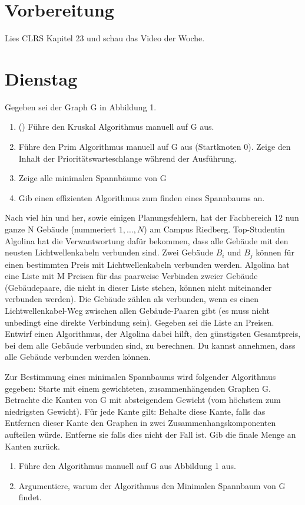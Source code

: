 \documentclass{uebung_cs}
\begin{document}
\section*{Vorbereitung}
Lies CLRS Kapitel 23 und schau das Video der Woche.

\section*{Dienstag}
\begin{aufgabe}\label{tue-first}
	Gegeben sei der Graph G in Abbildung 1.
	\begin{enumerate}
		\item (\warmup) Führe den Kruskal Algorithmus manuell auf G aus.
		\item Führe den Prim Algorithmus manuell auf G aus (Startknoten 0). Zeige den Inhalt der Prioritätswarteschlange während der Ausführung.
		\item Zeige alle minimalen Spannbäume von G
		\item Gib einen effizienten Algorithmus zum finden eines Spannbaums an.
	\end{enumerate}
\end{aufgabe}

\begin{aufgabe}
	Nach viel hin und her, sowie einigen Planungsfehlern, hat der Fachbereich 12 nun ganze N Gebäude (nummeriert $1,\ldots , N$) am Campus Riedberg.
	Top-Studentin Algolina hat die Verwantwortung dafür bekommen, dass alle Gebäude mit den neusten Lichtwellenkabeln verbunden sind.
	Zwei Gebäude $B_i$ und $B_j$ können für einen bestimmten Preis mit Lichtwellenkabeln verbunden werden.
	Algolina hat eine Liste mit M Preisen für das paarweise Verbinden zweier Gebäude (Gebäudepaare, die nicht in dieser Liste stehen, können nicht miteinander verbunden werden).
	Die Gebäude zählen als verbunden, wenn es einen Lichtwellenkabel-Weg zwischen allen Gebäude-Paaren gibt (es muss nicht unbedingt eine direkte Verbindung sein).
	Gegeben sei die Liste an Preisen.
	Entwirf einen Algorithmus, der Algolina dabei hilft, den günstigsten Gesamtpreis, bei dem alle Gebäude verbunden sind, zu berechnen.
	Du kannst annehmen, dass alle Gebäude verbunden werden können. 
\end{aufgabe}

\begin{aufgabe}
	Zur Bestimmung eines minimalen Spannbaums wird folgender Algorithmus gegeben: Starte mit einem gewichteten, zusammenhängenden Graphen G. Betrachte die Kanten von G mit absteigendem Gewicht (vom höchstem zum niedrigsten Gewicht).
	Für jede Kante gilt: Behalte diese Kante, falls das Entfernen dieser Kante den Graphen in zwei Zusammenhangskomponenten aufteilen würde. Entferne sie falls dies nicht der Fall ist.
	Gib die finale Menge an Kanten zurück.
	\begin{enumerate}
		\item Führe den Algorithmus manuell auf G aus Abbildung 1 aus.
		\item Argumentiere, warum der Algorithmus den Minimalen Spannbaum von G findet.
	\end{enumerate}
\end{aufgabe}
\end{document}
